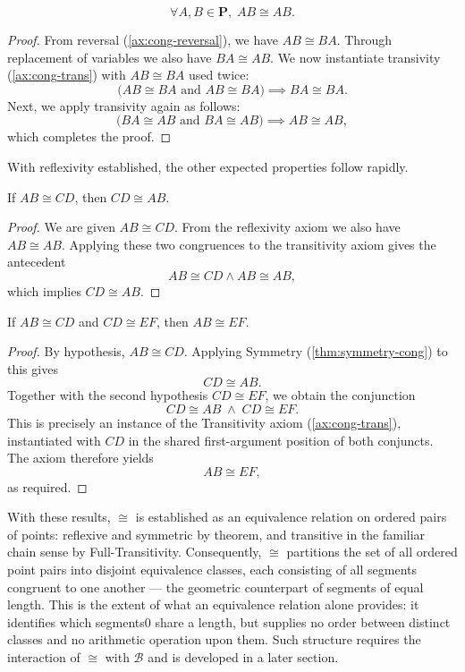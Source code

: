 \documentclass[../../../main/main.tex]{subfiles}
\begin{document}
\begin{theorem}
    \[
    \forall A, B \in \mathbf{P},\; AB \cong AB.
    \]
\end{theorem}
\begin{proof}
    From reversal (\autoref{ax:cong-reversal}), we have $AB \cong BA$. Through replacement of variables we also have $BA \cong AB$. We now instantiate transivity (\autoref{ax:cong-trans}) with $AB \cong BA$ used twice:
    \[
    \bigl(AB \cong BA \text{ and } AB \cong BA\bigr) \implies BA \cong BA.
    \]
    Next, we apply transivity again as follows:
    \[
    \bigl(BA \cong AB \text{ and } BA \cong AB\bigr) \implies AB \cong AB,
    \]
    which completes the proof.
\end{proof}


With reflexivity established, the other expected properties follow rapidly.

\begin{theorem}\label{thm:symmetry-cong}
    If $AB \cong CD$, then $CD \cong AB$.
\end{theorem}
\begin{proof}
    We are given $AB \cong CD$. From the reflexivity axiom we also have $AB \cong AB$. Applying these two congruences to the transitivity axiom gives the antecedent
    \[
    AB \cong CD \land AB \cong AB,
    \]
    which implies $CD \cong AB$.
\end{proof}

\begin{theorem}
    If $AB \cong CD$ and $CD \cong EF$, then $AB \cong EF$.
\end{theorem}
\begin{proof}
    By hypothesis, $AB \cong CD$. Applying Symmetry (\autoref{thm:symmetry-cong}) to this gives
    \[
    CD \cong AB.
    \]
    Together with the second hypothesis $CD \cong EF$, we obtain the conjunction
    \[
    CD \cong AB \;\land\; CD \cong EF.
    \]
    This is precisely an instance of the Transitivity axiom (\autoref{ax:cong-trans}), instantiated with $CD$ in the shared first-argument position of both conjuncts. The axiom therefore yields
    \[
    AB \cong EF,
    \]
    as required.
\end{proof}

With these results, $\cong$ is established as an equivalence relation on ordered pairs of points: reflexive and symmetric by theorem, and transitive in the familiar chain sense by Full-Transitivity.
Consequently, $\cong$ partitions the set of all ordered point pairs into disjoint equivalence classes, each consisting of all segments congruent to one another --- the geometric counterpart of segments of equal length. This is the extent of what an equivalence relation alone provides: it identifies which segments0 share a length, but supplies no order between distinct classes and no arithmetic operation upon them. Such structure requires the interaction of $\cong$ with $\mathcal{B}$ and is developed in a later section.
\end{document}
